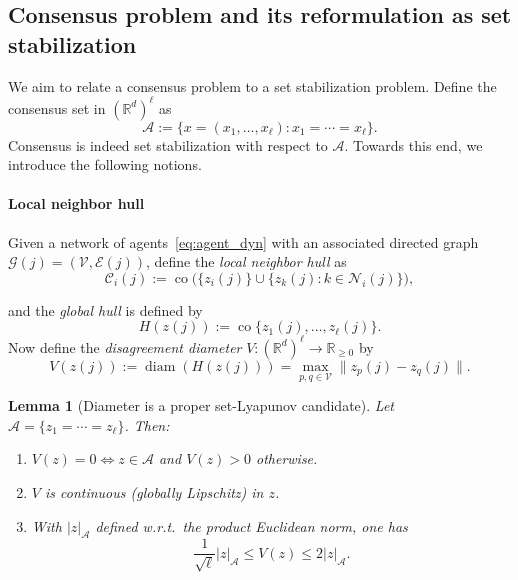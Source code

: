 \documentclass[12pt,draftcls,onecolumn]{IEEEtran}
\newtheorem{lemma}{Lemma}
\def\field#1{\mathbb #1}%
\def\R{\field{R}}%
\newcommand{\Rp}{\R_{\geq 0}}
\def\A{\mathcal{A}}
\begin{document}
\subsection{Consensus problem and its reformulation as set stabilization}
\label{subsec:consensus_problem}

We aim to relate a consensus problem to a set stabilization problem.
Define the consensus set in $(\mathbb{R}^d)^\ell$ as
\[
\A:=\{x=(x_1,\dots,x_\ell): x_1=\cdots=x_\ell\}.
\]
Consensus is indeed set stabilization with respect to $\A$.
Towards this end, we introduce the following notions.
\paragraph{Local neighbor hull}
Given a network of agents~\eqref{eq:agent_dyn} with an associated directed graph
$\mathcal{G}(j)=(\mathcal{V},\mathcal{E}(j))$, define the \emph{local neighbor hull} as
\begin{equation}\label{eq:Ci_def_moreau}
\mathcal{C}_i(j):=\operatorname{co}\Big(\{z_i(j)\}\cup\{z_k(j):k\in\mathcal{N}_i(j)\}\Big) ,
\end{equation}

and the \emph{global hull} is defined by
\begin{equation}\label{eq:H_def_moreau}
H(z(j)):=\operatorname{co}\{z_1(j),\dots,z_\ell(j)\}.
\end{equation}
Now define the \emph{disagreement diameter} $V : \left(\R^d\right)^\ell \to \Rp$ by
\begin{equation}\label{eq:V_diameter}
V(z(j)):=\operatorname{diam}(H(z(j)))=\max_{p,q\in\mathcal{V}}\|z_p(j)-z_q(j)\|.
\end{equation}

\begin{lemma}[Diameter is a proper set-Lyapunov candidate]\label{lem:V_props}
Let $\A=\{z_1=\cdots=z_\ell\}$. Then:
\begin{enumerate}
\item $V(z)=0\iff z\in \A$ and $V(z)>0$ otherwise.
\item $V$ is continuous (globally Lipschitz) in $z$.
\item With $|z|_\A$ defined w.r.t.\ the product Euclidean norm, one has
\begin{equation}\label{eq:V_bounds}
\frac{1}{\sqrt{\ell}}|z|_\A \le V(z)\le 2|z|_\A.
\end{equation}
\end{enumerate}
\end{lemma}
\end{document}
